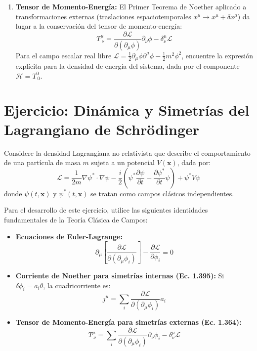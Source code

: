 \begin{enumerate}
    \item \textbf{Tensor de Momento-Energía:} 
    El Primer Teorema de Noether aplicado a transformaciones externas (traslaciones espaciotemporales $x^\mu \to x^\mu + \delta x^\mu$) da lugar a la conservación del tensor de momento-energía:
    \begin{equation*}
        T^\mu_{\ \nu} = \frac{\partial \mathcal{L}}{\partial(\partial_\mu \phi)} \partial_\nu \phi - \delta^\mu_\nu \mathcal{L}
    \end{equation*}
    Para el campo escalar real libre $\mathcal{L} = \frac{1}{2}\partial_\mu\phi\partial^\mu\phi - \frac{1}{2}m^2\phi^2$, encuentre la expresión explícita para la densidad de energía del sistema, dada por el componente $\mathcal{H} = T^0_{\ 0}$.

\end{enumerate}


\section*{Ejercicio: Dinámica y Simetrías del Lagrangiano de Schrödinger}
\label{sec:ejercicio_schrodinger}

Considere la densidad Lagrangiana no relativista que describe el comportamiento de una partícula de masa $m$ sujeta a un potencial $V(\mathbf{x})$, dada por:
\begin{equation}
    \mathcal{L} = \frac{1}{2m} \nabla\psi^* \cdot \nabla\psi - \frac{i}{2} \left( \psi^* \frac{\partial \psi}{\partial t} - \frac{\partial \psi^*}{\partial t} \psi \right) + \psi^* V \psi
    \label{eq:L_schrodinger}
\end{equation}
donde $\psi(t, \mathbf{x})$ y $\psi^*(t, \mathbf{x})$ se tratan como campos clásicos independientes.

Para el desarrollo de este ejercicio, utilice las siguientes identidades fundamentales de la Teoría Clásica de Campos:
\begin{itemize}
    \item \textbf{Ecuaciones de Euler-Lagrange:}
    \begin{equation}
        \partial_\mu \left[ \frac{\partial \mathcal{L}}{\partial(\partial_\mu\phi_i)} \right] - \frac{\partial \mathcal{L}}{\partial\phi_i} = 0
    \end{equation}
    \item \textbf{Corriente de Noether para simetrías internas (Ec. 1.395):}
    Si $\delta\phi_i = a_i \theta$, la cuadricorriente es:
    \begin{equation}
        j^\mu = \sum_i \frac{\partial \mathcal{L}}{\partial(\partial_\mu\phi_i)} a_i
    \end{equation}
    \item \textbf{Tensor de Momento-Energía para simetrías externas (Ec. 1.364):}
    \begin{equation}
        T^\mu_{\ \nu} = \sum_i \frac{\partial \mathcal{L}}{\partial(\partial_\mu \phi_i)}\partial_\nu \phi_i - \delta^\mu_\nu \mathcal{L}
    \end{equation}
\end{itemize}

